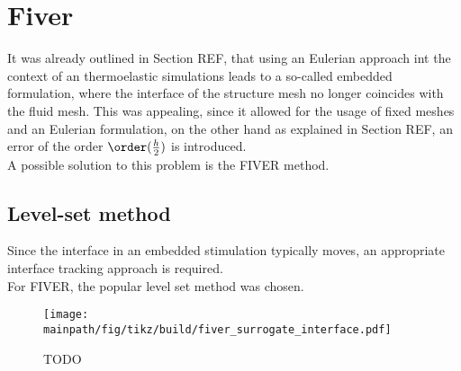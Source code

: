 \documentclass[../main.tex]{subfiles}
\begin{document}
\setlength{\delimitershortfall}{0pt}
\section{Fiver}\label{sec:fiver}

It was already outlined in Section REF, that using an Eulerian approach int the context of an thermoelastic simulations leads to a so-called embedded formulation, where the interface of the structure mesh no longer coincides with the fluid mesh. This was appealing, since it allowed for the usage of fixed meshes and an Eulerian formulation, on the other hand as  explained in Section REF, an error of the order $\order(\frac{h}{2})$ is introduced.\\

A possible solution to this problem is the \ac{FIVER} method.


\subsection{Level-set method}
Since the interface in an embedded stimulation typically moves, an appropriate interface tracking approach is required.\\
For \ac{FIVER}, the popular level set method was chosen.

\begin{figure}[h!]
	\begin{center}
        \texttt{[image: \\mainpath/fig/tikz/build/fiver\_surrogate\_interface.pdf]}
        \caption[TODO]{TODO}
		\label{aaa}
    \end{center}
\end{figure}
\end{document}
